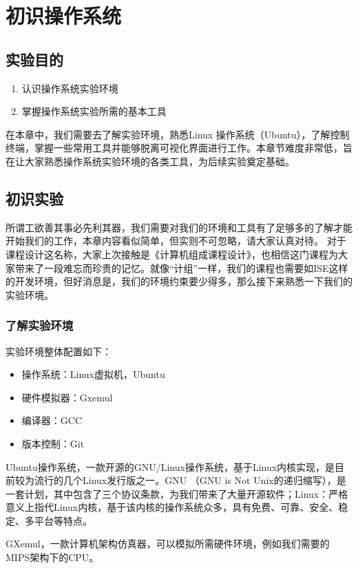 \chapter{初识操作系统}

\section{实验目的}
  \begin{enumerate}
    \item 认识操作系统实验环境
    \item 掌握操作系统实验所需的基本工具
  \end{enumerate}

在本章中，我们需要去了解实验环境，熟悉Linux 操作系统（Ubuntu），了解控制终端，掌握一些常用工具并能够脱离可视化界面进行工作。本章节难度非常低，旨在让大家熟悉操作系统实验环境的各类工具，为后续实验奠定基础。

\section{初识实验}
所谓工欲善其事必先利其器，我们需要对我们的环境和工具有了足够多的了解才能开始我们的工作，本章内容看似简单，但实则不可忽略，请大家认真对待。
对于课程设计这名称，大家上次接触是《计算机组成课程设计》，也相信这门课程为大家带来了一段难忘而珍贵的记忆。就像“计组”一样，我们的课程也需要如ISE这样的开发环境，但好消息是，我们的环境约束要少得多，那么接下来熟悉一下我们的实验环境。

\subsection{了解实验环境}
实验环境整体配置如下：
\begin{itemize}
    \item 操作系统：Linux虚拟机，Ubuntu
    \item 硬件模拟器：Gxemul
    \item 编译器：GCC
    \item 版本控制：Git
 \end{itemize}

Ubuntu操作系统，一款开源的GNU/Linux操作系统，基于Linux内核实现，是目前较为流行的几个Linux发行版之一。GNU （GNU is Not Unix的递归缩写），是一套计划，其中包含了三个协议条款，为我们带来了大量开源软件；Linux：严格意义上指代Linux内核，基于该内核的操作系统众多，具有免费、可靠、安全、稳定、多平台等特点。

GXemul，一款计算机架构仿真器，可以模拟所需硬件环境，例如我们需要的MIPS架构下的CPU。

